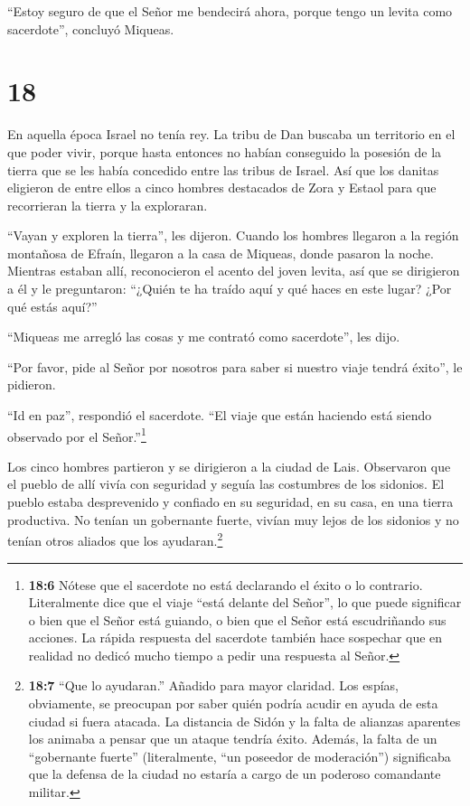  ``Estoy seguro de que el Señor me bendecirá ahora, porque
tengo un levita como sacerdote'', concluyó Miqueas.

\hypertarget{section-17}{%
\section{18}\label{section-17}}

 En aquella época Israel no tenía rey. La tribu de Dan
buscaba un territorio en el que poder vivir, porque hasta entonces no
habían conseguido la posesión de la tierra que se les había concedido
entre las tribus de Israel.  Así que los danitas eligieron
de entre ellos a cinco hombres destacados de Zora y Estaol para que
recorrieran la tierra y la exploraran.

``Vayan y exploren la tierra'', les dijeron. Cuando los hombres llegaron
a la región montañosa de Efraín, llegaron a la casa de Miqueas, donde
pasaron la noche.  Mientras estaban allí, reconocieron el
acento del joven levita, así que se dirigieron a él y le preguntaron:
``¿Quién te ha traído aquí y qué haces en este lugar? ¿Por qué estás
aquí?''

 ``Miqueas me arregló las cosas y me contrató como
sacerdote'', les dijo.

 ``Por favor, pide al Señor por nosotros para saber si
nuestro viaje tendrá éxito'', le pidieron.

 ``Id en paz'', respondió el sacerdote. ``El viaje que están
haciendo está siendo observado por el Señor.''\footnote{\textbf{18:6}
  Nótese que el sacerdote no está declarando el éxito o lo contrario.
  Literalmente dice que el viaje ``está delante del Señor'', lo que
  puede significar o bien que el Señor está guiando, o bien que el Señor
  está escudriñando sus acciones. La rápida respuesta del sacerdote
  también hace sospechar que en realidad no dedicó mucho tiempo a pedir
  una respuesta al Señor.}

 Los cinco hombres partieron y se dirigieron a la ciudad de
Lais. Observaron que el pueblo de allí vivía con seguridad y seguía las
costumbres de los sidonios. El pueblo estaba desprevenido y confiado en
su seguridad, en su casa, en una tierra productiva. No tenían un
gobernante fuerte, vivían muy lejos de los sidonios y no tenían otros
aliados que los ayudaran.\footnote{\textbf{18:7} ``Que lo ayudaran.''
  Añadido para mayor claridad. Los espías, obviamente, se preocupan por
  saber quién podría acudir en ayuda de esta ciudad si fuera atacada. La
  distancia de Sidón y la falta de alianzas aparentes los animaba a
  pensar que un ataque tendría éxito. Además, la falta de un
  ``gobernante fuerte'' (literalmente, ``un poseedor de moderación'')
  significaba que la defensa de la ciudad no estaría a cargo de un
  poderoso comandante militar.}

